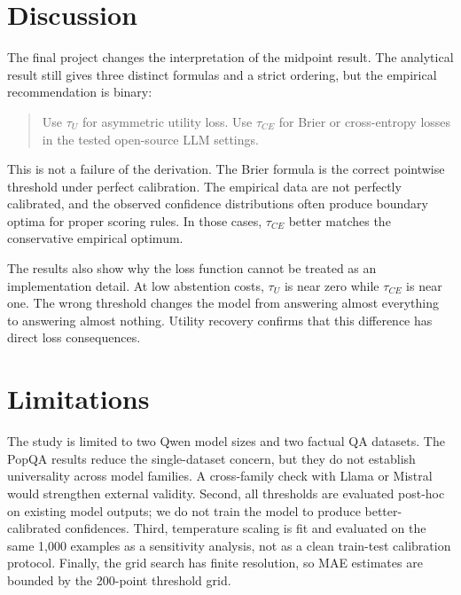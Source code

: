 \documentclass[letterpaper,10pt,twocolumn]{article}
\begin{document}
\section{Discussion}

The final project changes the interpretation of the midpoint result. The
analytical result still gives three distinct formulas and a strict ordering,
but the empirical recommendation is binary:
\begin{quote}
Use $\tau_U$ for asymmetric utility loss. Use $\tau_{CE}$ for Brier or
cross-entropy losses in the tested open-source LLM settings.
\end{quote}
This is not a failure of the derivation. The Brier formula is the correct
pointwise threshold under perfect calibration. The empirical data are not
perfectly calibrated, and the observed confidence distributions often produce
boundary optima for proper scoring rules. In those cases, $\tau_{CE}$ better
matches the conservative empirical optimum.

The results also show why the loss function cannot be treated as an
implementation detail. At low abstention costs, $\tau_U$ is near zero while
$\tau_{CE}$ is near one. The wrong threshold changes the model from answering
almost everything to answering almost nothing. Utility recovery confirms that
this difference has direct loss consequences.

\section{Limitations}

The study is limited to two Qwen model sizes and two factual QA datasets. The
PopQA results reduce the single-dataset concern, but they do not establish
universality across model families. A cross-family check with Llama or Mistral
would strengthen external validity. Second, all thresholds are evaluated
post-hoc on existing model outputs; we do not train the model to produce
better-calibrated confidences. Third, temperature scaling is fit and evaluated
on the same 1,000 examples as a sensitivity analysis, not as a clean
train-test calibration protocol. Finally, the grid search has finite
resolution, so MAE estimates are bounded by the 200-point threshold grid.

\end{document}
